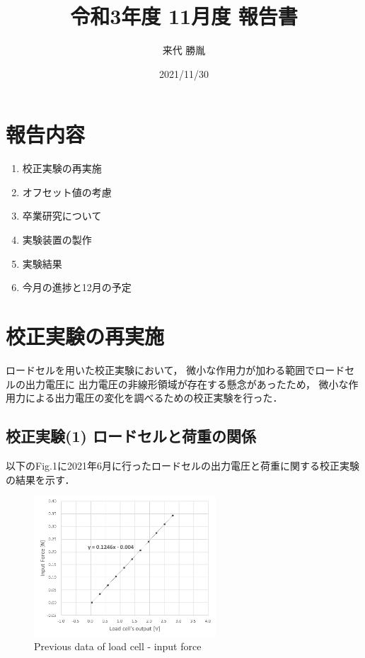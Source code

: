 \documentclass[twocolumn,a4j]{jsarticle}
\author{来代 勝胤}
\title{令和3年度 11月度 報告書}
\date{2021/11/30}
\begin{document}
\columnseprule=0.1mm

\maketitle
\section*{報告内容}
\begin{enumerate}[1.]
    \item 校正実験の再実施
    \item オフセット値の考慮
    \item 卒業研究について
    \item 実験装置の製作
    \item 実験結果
    \item 今月の進捗と12月の予定
\end{enumerate}

\section{校正実験の再実施}
ロードセルを用いた校正実験において，
微小な作用力が加わる範囲でロードセルの出力電圧に
出力電圧の非線形領域が存在する懸念があったため，
微小な作用力による出力電圧の変化を調べるための校正実験を行った．\\

\subsection{校正実験(1) ロードセルと荷重の関係}
以下のFig.1に2021年6月に行ったロードセルの出力電圧と荷重に関する校正実験の結果を示す．

\begin{figure}[htbp]
    \footnotesize
    \begin{center}
        \includegraphics[width=68mm]{../images/calibration_1.png}
        \caption{Previous data of load cell - input force}
    \end{center}
\end{figure}
\end{document}
